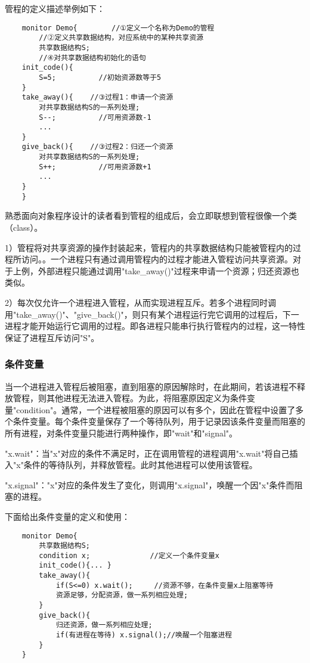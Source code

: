 \documentclass{ctexbook}
\begin{document}
管程的定义描述举例如下：
\begin{verbatim}
	monitor Demo{        //①定义一个名称为Demo的管程
		//②定义共享数据结构，对应系统中的某种共享资源
		共享数据结构S;
		//④对共享数据结构初始化的语句
	init_code(){
		S=5;          //初始资源数等于5
	}
	take_away(){    //③过程1：申请一个资源
		对共享数据结构S的一系列处理;
		S--;          //可用资源数-1
		...
	}
	give_back(){    //③过程2：归还一个资源
		对共享数据结构S的一系列处理;
		S++;          //可用资源数+1
		...
	}
	}
\end{verbatim}

熟悉面向对象程序设计的读者看到管程的组成后，会立即联想到管程很像一个类（class）。

1）管程将对共享资源的操作封装起来，管程内的共享数据结构只能被管程内的过程所访问。。一个进程只有通过调用管程内的过程才能进入管程访问共享资源。对于上例，外部进程只能通过调用"take\_away()"过程来申请一个资源；归还资源也类似。

2）每次仅允许一个进程进入管程，从而实现进程互斥。若多个进程同时调用"take\_away()"、"give\_back()"，则只有某个进程运行完它调用的过程后，下一进程才能开始运行它调用的过程。即各进程只能串行执行管程内的过程，这一特性保证了进程互斥访问"S"。

\subsubsection{条件变量}
当一个进程进入管程后被阻塞，直到阻塞的原因解除时，在此期间，若该进程不释放管程，则其他进程无法进入管程。为此，将阻塞原因定义为条件变量"condition"。通常，一个进程被阻塞的原因可以有多个，因此在管程中设置了多个条件变量。每个条件变量保存了一个等待队列，用于记录因该条件变量而阻塞的所有进程，对条件变量只能进行两种操作，即"wait"和"signal"。

"x.wait"：当"x"对应的条件不满足时，正在调用管程的进程调用"x.wait"将自己插入"x"条件的等待队列，并释放管程。此时其他进程可以使用该管程。

"x.signal"："x"对应的条件发生了变化，则调用"x.signal"，唤醒一个因"x"条件而阻塞的进程。

下面给出条件变量的定义和使用：
\begin{verbatim}
	monitor Demo{
		共享数据结构S;
		condition x;              //定义一个条件变量x
		init_code(){... }
		take_away(){
			if(S<=0) x.wait();     //资源不够，在条件变量x上阻塞等待
			资源足够，分配资源，做一系列相应处理;
		}
		give_back(){
			归还资源，做一系列相应处理;
			if(有进程在等待) x.signal();//唤醒一个阻塞进程
		}
	}
\end{verbatim}
\end{document}
